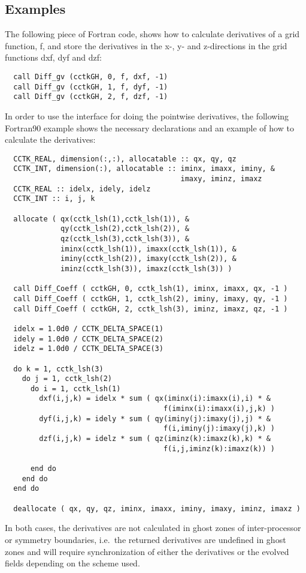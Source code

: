 \subsection{Examples}
The following piece of Fortran code, shows how to calculate derivatives of
a grid function, f, and store the derivatives in the x-, y- and z-directions
in the grid functions  dxf, dyf and dzf:
\begin{verbatim}
  call Diff_gv (cctkGH, 0, f, dxf, -1)
  call Diff_gv (cctkGH, 1, f, dyf, -1)
  call Diff_gv (cctkGH, 2, f, dzf, -1)
\end{verbatim}
In order to use the interface for doing the pointwise derivatives, the
following Fortran90 example shows the necessary declarations and an example
of how to calculate the derivatives:
\begin{verbatim}
  CCTK_REAL, dimension(:,:), allocatable :: qx, qy, qz
  CCTK_INT, dimension(:), allocatable :: iminx, imaxx, iminy, &
                                         imaxy, iminz, imaxz
  CCTK_REAL :: idelx, idely, idelz
  CCTK_INT :: i, j, k

  allocate ( qx(cctk_lsh(1),cctk_lsh(1)), &
             qy(cctk_lsh(2),cctk_lsh(2)), &
             qz(cctk_lsh(3),cctk_lsh(3)), &
             iminx(cctk_lsh(1)), imaxx(cctk_lsh(1)), &
             iminy(cctk_lsh(2)), imaxy(cctk_lsh(2)), &
             iminz(cctk_lsh(3)), imaxz(cctk_lsh(3)) )

  call Diff_Coeff ( cctkGH, 0, cctk_lsh(1), iminx, imaxx, qx, -1 )
  call Diff_Coeff ( cctkGH, 1, cctk_lsh(2), iminy, imaxy, qy, -1 )
  call Diff_Coeff ( cctkGH, 2, cctk_lsh(3), iminz, imaxz, qz, -1 )

  idelx = 1.0d0 / CCTK_DELTA_SPACE(1)
  idely = 1.0d0 / CCTK_DELTA_SPACE(2)
  idelz = 1.0d0 / CCTK_DELTA_SPACE(3)

  do k = 1, cctk_lsh(3)
    do j = 1, cctk_lsh(2)
      do i = 1, cctk_lsh(1)
        dxf(i,j,k) = idelx * sum ( qx(iminx(i):imaxx(i),i) * &
                                     f(iminx(i):imaxx(i),j,k) )
        dyf(i,j,k) = idely * sum ( qy(iminy(j):imaxy(j),j) * &
                                     f(i,iminy(j):imaxy(j),k) )
        dzf(i,j,k) = idelz * sum ( qz(iminz(k):imaxz(k),k) * &
                                     f(i,j,iminz(k):imaxz(k)) )

      end do
    end do
  end do

  deallocate ( qx, qy, qz, iminx, imaxx, iminy, imaxy, iminz, imaxz )
\end{verbatim}

In both cases, the derivatives are not calculated in ghost zones of 
inter-processor or symmetry boundaries, i.e.\ the returned derivatives are
undefined in ghost zones and will require synchronization of either the
derivatives or the evolved fields depending on the scheme used.

